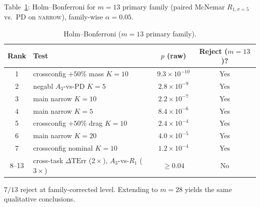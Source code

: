 \documentclass[11pt,a4paper]{article}
\newcommand{\TErr}{\mathrm{TErr}}
\begin{document}
Table~\ref{tab:s5-holm}: Holm--Bonferroni for $m = 13$ primary family
(paired McNemar $R_{1,\sigma=5}$ vs.\ PD on \textsc{narrow}),
family-wise $\alpha = 0.05$.

\begin{table}[h]
\centering
\caption{Holm--Bonferroni ($m = 13$ primary family).}\label{tab:s5-holm}
\begin{tabular}{clcc}
\toprule
Rank & Test & $p$ (raw) & Reject ($m = 13$)? \\
\midrule
1 & crossconfig $+50\%$ mass $K{=}10$ & $9.3 \times 10^{-10}$ & Yes \\
2 & negabl $A_3$-vs-PD $K{=}5$      & $2.8 \times 10^{-9}$  & Yes \\
3 & main narrow $K{=}10$             & $2.2 \times 10^{-7}$  & Yes \\
4 & main narrow $K{=}5$              & $8.4 \times 10^{-6}$  & Yes \\
5 & crossconfig $+50\%$ drag $K{=}10$ & $2.4 \times 10^{-4}$  & Yes \\
6 & main narrow $K{=}20$             & $4.0 \times 10^{-5}$  & Yes \\
7 & crossconfig nominal $K{=}10$     & $1.2 \times 10^{-4}$  & Yes \\
8--13 & cross-task $\Delta\TErr$ ($2\times$), $A_3$-vs-$R_1$ ($3\times$) & $\ge 0.04$ & No \\
\bottomrule
\end{tabular}
\par\smallskip
$7/13$ reject at family-corrected level. Extending to $m = 28$ yields
the same qualitative conclusions.
\end{table}
\end{document}
